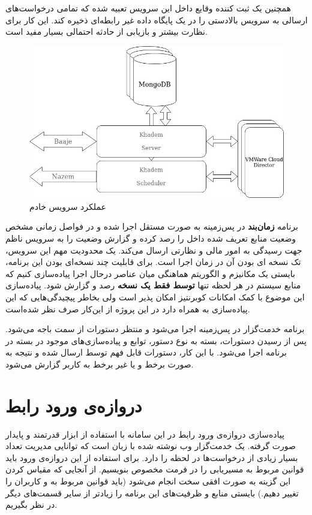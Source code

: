 همچنین یک ثبت کننده وقایع داخل این سرویس تعبیه شده که تمامی درخواست‌های ارسالی به سرویس‌ بالا‌دستی را در یک پایگاه داده غیر رابطه‌ای ذخیره کند. این کار برای نظارت بیشتر و بازیابی از حادثه احتمالی بسیار مفید است.

\begin{figure}
	\centering
	\includegraphics[scale=0.5]{figures/30bird-khadem.jpeg}
	\caption{عملکرد سرویس خادم}
	\label{fig:30bird-khadem}
\end{figure}

برنامه \textbf{زمان‌بند} در پس‌زمینه به صورت مستقل اجرا شده و در فواصل زمانی مشخص وضعیت منابع تعریف شده داخل  را رصد کرده و گزارش وضعیت را به سرویس ناظم جهت رسیدگی به امور مالی و نظارتی ارسال می‌کند. یک محدودیت مهم این سرویس، تک نسخه ای بودن آن در زمان اجرا است. برای قابلیت چند نسخه‌ای بودن این برنامه، بایستی یک مکانیزم و الگوریتم هماهنگی میان عناصر درحال اجرا پیاده‌سازی کنیم که منابع سیستم در هر لحظه تنها \textbf{توسط فقط یک نسخه} رصد و گزارش شود. پیاده‌سازی این موضوع با کمک امکانات کوبرنتیز امکان پذیر است ولی بخاطر پیچیدگی‌هایی که این پیاده‌سازی به همراه دارد در این پروژه از این‌کار صرف نظر شده‌است.

برنامه خدمت‌گزار در پس‌زمینه اجرا می‌شود و منتظر دستورات از سمت باجه می‌شود. پس از رسیدن دستورات، بسته به نوع دستور، توابع و پیاده‌سازی‌های موجود در بسته  در برنامه اجرا می‌شود. با این کار، دستورات قابل فهم توسط  ارسال شده و نتیجه به صورت برخط و یا غیر برخط به کاربر گزارش می‌شود.


\section{‌دروازه‌ی ورود رابط}
پیاده‌سازی ‌دروازه‌ی ورود رابط در این سامانه با استفاده از ابزار قدرتمند و پایدار  صورت گرفته.  یک خدمت‌گزار وب نوشته شده با زبان  است که توانایی مدیریت تعداد بسیار زیادی از درخواست‌ها در لحظه را دارد. برای استفاده از این ‌دروازه‌ی ورود باید قوانین مربوط به مسیریابی را در فرمت مخصوص بنویسیم. از آنجایی که مقیاس کردن این گزینه به صورت افقی سخت انجام می‌شود (باید قوانین مربوط به  و کاربران را تغییر دهیم.) بایستی منابع و ظرفیت‌های این برنامه‌ را زیاد‌تر از سایر قسمت‌های دیگر در نظر بگیریم.



